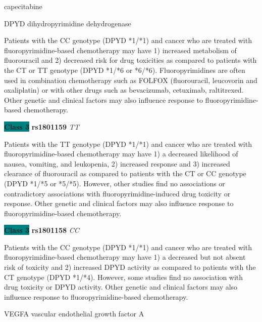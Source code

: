 \documentclass{resume} %
\begin{document}
\begin{rSection}{ capecitabine }
\begin{rSubsection}{ DPYD }{ dihydropyrimidine dehydrogenase }{}{}
\item[] Patients with the CC genotype (DPYD *1/*1) and cancer who are treated with fluoropyrimidine-based chemotherapy may have 1) increased metabolism of fluorouracil and 2) decreased risk for drug toxicities as compared to patients with the CT or TT genotype (DPYD *1/*6 or *6/*6). Fluoropyrimidines are often used in combination chemotherapy such as FOLFOX (fluorouracil, leucovorin and oxaliplatin) or with other drugs such as bevacizumab, cetuximab, raltitrexed. Other genetic and clinical factors may also influence response to fluoropyrimidine-based chemotherapy.\item \textbf{\colorbox{teal} {Class 3}} \textbf{ rs1801159 } \textit{ TT }
\item[] Patients with the TT genotype (DPYD *1/*1) and cancer who are treated with fluoropyrimidine-based chemotherapy may have 1) a decreased likelihood of nausea, vomiting, and leukopenia, 2) increased response and 3) increased clearance of fluorouracil as compared to patients with the CT or CC genotype (DPYD *1/*5 or *5/*5). However, other studies find no associations or contradictory associations with fluoropyrimidine-induced drug toxicity or response. Other genetic and clinical factors may also influence response to fluoropyrimidine-based chemotherapy.\item \textbf{\colorbox{teal} {Class 3}} \textbf{ rs1801158 } \textit{ CC }
\item[] Patients with the CC genotype (DPYD *1/*1) and cancer who are treated with fluoropyrimidine-based chemotherapy may have 1) a decreased but not absent risk of toxicity and 2) increased DPYD activity as compared to patients with the CT genotype (DPYD *1/*4). However, some studies find no association with drug toxicity or DPYD activity. Other genetic and clinical factors may also influence response to fluoropyrimidine-based chemotherapy.
\end{rSubsection}\begin{rSubsection}{ VEGFA }{ vascular endothelial growth factor A }{}{}
\item[]


\end{rSubsection}
\end{rSection}
\end{document}
